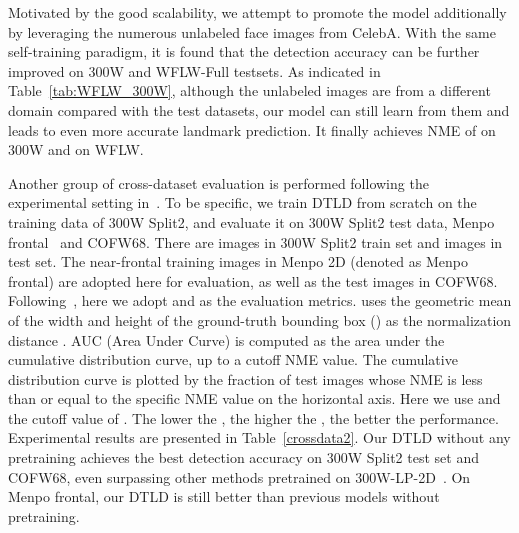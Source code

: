 Motivated by the good scalability, we attempt to promote the model additionally by leveraging the numerous unlabeled face images from CelebA. With the same self-training paradigm, it is found that the detection accuracy can be further improved on 300W and WFLW-Full testsets.  As indicated in Table~\ref{tab:WFLW_300W}, although the unlabeled images are from a different domain compared with the test datasets, our model can still learn from them and leads to even more accurate landmark prediction.  It finally achieves NME of  on 300W and  on WFLW.

Another group of cross-dataset evaluation is performed following the experimental setting in~\cite{LUVLi}. To be specific, we train DTLD from scratch on the training data of 300W Split2, and evaluate it on 300W Split2 test data, Menpo frontal~\cite{Menpo,Menpo1,Menpo2} and COFW68. There are  images in 300W Split2 train
set and  images in test set.  The  near-frontal training images in Menpo 2D (denoted as Menpo frontal) are adopted here for evaluation, as well as the  test images in COFW68. Following~\cite{LUVLi}, here we adopt  and  as the evaluation metrics.  uses the geometric mean of the width and height of the ground-truth bounding box () as the normalization distance . AUC (Area Under Curve) is computed as the area under the cumulative distribution curve, up to a cutoff NME value. The cumulative distribution curve is plotted by the fraction of test images whose NME is less than or equal to the specific NME value on the horizontal axis. Here we use  and the cutoff value of . The lower the , the higher the  , the better the performance. Experimental results are presented in Table~\ref{crossdata2}. Our DTLD without any pretraining achieves the best detection accuracy on 300W Split2 test set and COFW68, even surpassing other methods pretrained on 300W-LP-2D~\cite{300WLP}. On Menpo frontal, our DTLD is still better than previous models without pretraining.

